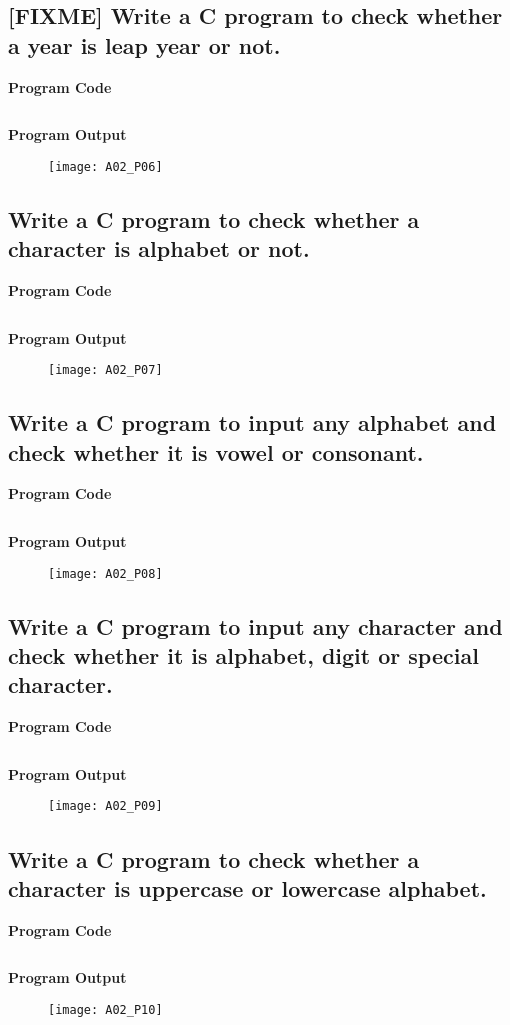 \subsection{[FIXME] Write a C program to check whether a year is leap year or not.}
\textbf{Program Code}
\inputminted[breaklines]{C}{programs/A02_P06.c}
\textbf{Program Output}
\begin{figure}[h]
  \texttt{[image: A02\_P06]}
\end{figure}
\pagebreak


\subsection{Write a C program to check whether a character is alphabet or not.}
\textbf{Program Code}
\inputminted[breaklines]{C}{programs/A02_P07.c}
\textbf{Program Output}
\begin{figure}[h]
  \texttt{[image: A02\_P07]}
\end{figure}
\pagebreak

\subsection{Write a C program to input any alphabet and check whether it is vowel or consonant.}
\textbf{Program Code}
\inputminted[breaklines]{C}{programs/A02_P08.c}
\textbf{Program Output}
\begin{figure}[h]
  \texttt{[image: A02\_P08]}
\end{figure}
\pagebreak

\subsection{Write a C program to input any character and check whether it is alphabet, digit or special character.}
\textbf{Program Code}
\inputminted[breaklines]{C}{programs/A02_P09.c}
\textbf{Program Output}
\begin{figure}[h]
  \texttt{[image: A02\_P09]}
\end{figure}
\pagebreak

\subsection{Write a C program to check whether a character is uppercase or lowercase alphabet.}
\textbf{Program Code}
\inputminted[breaklines]{C}{programs/A02_P10.c}
\textbf{Program Output}
\begin{figure}[h]
  \texttt{[image: A02\_P10]}
\end{figure}
\pagebreak

